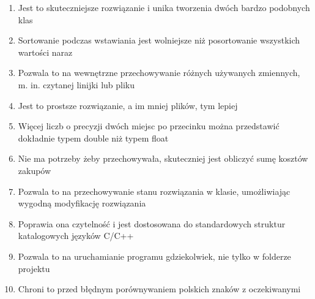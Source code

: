 \documentclass{article}
\begin{document}
\begin{enumerate}
	\item Jest to skuteczniejsze rozwiązanie i unika tworzenia dwóch bardzo podobnych klas
	\item Sortowanie podczas wstawiania jest wolniejsze niż posortowanie wszystkich wartości naraz
	\item Pozwala to na wewnętrzne przechowywanie różnych używanych zmiennych, m. in. czytanej linijki lub pliku
	\item Jest to prostsze rozwiązanie, a im mniej plików, tym lepiej
	\item Więcej liczb o precyzji dwóch miejsc po przecinku można przedstawić dokładnie typem double niż typem float
	\item Nie ma potrzeby żeby przechowywała, skuteczniej jest obliczyć sumę kosztów zakupów
	\item Pozwala to na przechowywanie stanu rozwiązania w klasie, umożliwiając wygodną modyfikację rozwiązania
	\item Poprawia ona czytelność i jest dostosowana do standardowych struktur katalogowych języków C/C++
	\item Pozwala to na uruchamianie programu gdziekolwiek, nie tylko w folderze projektu
	\item Chroni to przed błędnym porównywaniem polskich znaków z oczekiwanymi
\end{enumerate}
\end{document}
